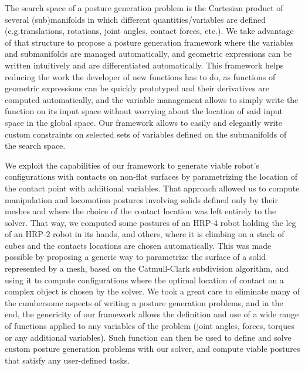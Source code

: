 The search space of a posture generation problem is the Cartesian product of several (sub)manifolds in which different quantities/variables are defined (e.g.translations, rotations, joint angles, contact forces, etc.).
We take advantage of that structure to propose a posture generation framework where the variables and submanifolds are managed automatically, and geometric expressions can be written intuitively and are differentiated automatically.
This framework helps reducing the work the developer of new functions has to do, as functions of geometric expressions can be quickly prototyped and their derivatives are computed automatically, and the variable management allows to simply write the function on its input space without worrying about the location of said input space in the global space.
Our framework allows to easily and elegantly write custom constraints on selected sets of variables defined on the submanifolds of the search space.

We exploit the capabilities of our framework to generate viable robot's configurations with contacts on non-flat surfaces by parametrizing the location of the contact point with additional variables.
That approach allowed us to compute manipulation and locomotion postures involving solids defined only by their meshes and where the choice of the contact location was left entirely to the solver.
That way, we computed some postures of an HRP-4 robot holding the leg of an HRP-2 robot in its hands, and others, where it is climbing on a stack of cubes and the contacts locations are chosen automatically.
This was made possible by proposing a generic way to parametrize the surface of a solid represented by a mesh, based on the Catmull-Clark subdivision algorithm, and using it to compute configurations where the optimal location of contact on a complex object is chosen by the solver.
We took a great care to eliminate many of the cumbersome aspects of writing a posture generation problems, and in the end, the genericity of our framework allows the definition and use of a wide range of functions applied to any variables of the problem (joint angles, forces, torques or any additional variables).
Such function can then be used to define and solve custom posture generation problems with our solver, and compute viable postures that satisfy any user-defined tasks.

